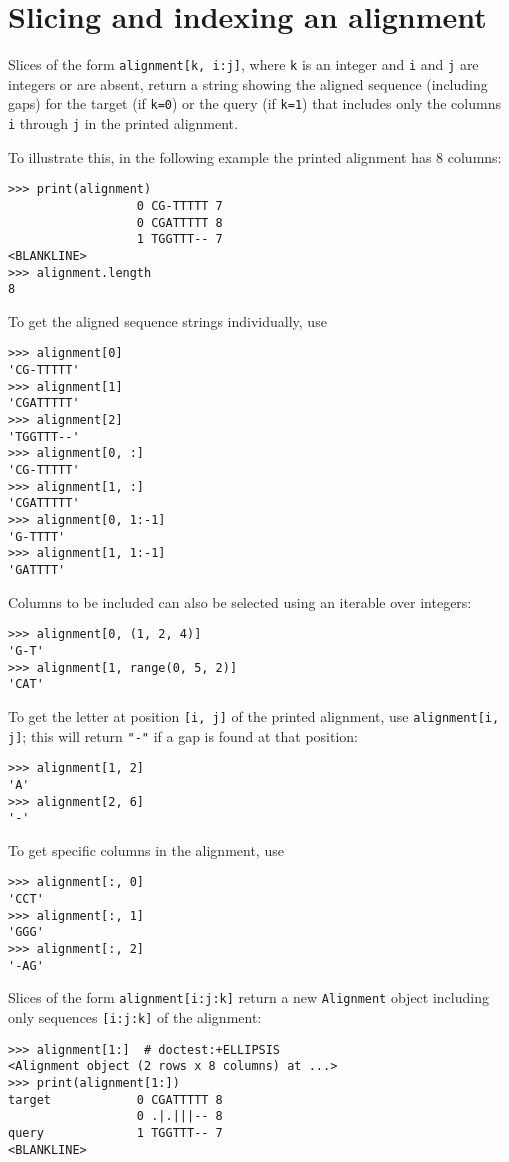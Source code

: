 \section{Slicing and indexing an alignment}

Slices of the form \verb+alignment[k, i:j]+, where \verb+k+ is an integer and \verb+i+ and \verb+j+ are integers or are absent, return a string showing the aligned sequence (including gaps) for the target (if \verb+k=0+) or the query (if \verb+k=1+) that includes only the columns \verb+i+ through \verb+j+ in the printed alignment.

To illustrate this, in the following example the printed alignment has 8 columns:

\begin{verbatim}
>>> print(alignment)
                  0 CG-TTTTT 7
                  0 CGATTTTT 8
                  1 TGGTTT-- 7
<BLANKLINE>
>>> alignment.length
8
\end{verbatim}

To get the aligned sequence strings individually, use
\begin{verbatim}
>>> alignment[0]
'CG-TTTTT'
>>> alignment[1]
'CGATTTTT'
>>> alignment[2]
'TGGTTT--'
>>> alignment[0, :]
'CG-TTTTT'
>>> alignment[1, :]
'CGATTTTT'
>>> alignment[0, 1:-1]
'G-TTTT'
>>> alignment[1, 1:-1]
'GATTTT'
\end{verbatim}

Columns to be included can also be selected using an iterable over integers:
\begin{verbatim}
>>> alignment[0, (1, 2, 4)]
'G-T'
>>> alignment[1, range(0, 5, 2)]
'CAT'
\end{verbatim}

To get the letter at position \verb+[i, j]+ of the printed alignment, use \verb|alignment[i, j]|; this will return \verb|"-"| if a gap is found at that position:
\begin{verbatim}
>>> alignment[1, 2]
'A'
>>> alignment[2, 6]
'-'
\end{verbatim}

To get specific columns in the alignment, use
\begin{verbatim}
>>> alignment[:, 0]
'CCT'
>>> alignment[:, 1]
'GGG'
>>> alignment[:, 2]
'-AG'
\end{verbatim}

Slices of the form \verb+alignment[i:j:k]+ return a new \verb+Alignment+ object including only sequences \verb+[i:j:k]+ of the alignment:
\begin{verbatim}
>>> alignment[1:]  # doctest:+ELLIPSIS
<Alignment object (2 rows x 8 columns) at ...>
>>> print(alignment[1:])
target            0 CGATTTTT 8
                  0 .|.|||-- 8
query             1 TGGTTT-- 7
<BLANKLINE>
\end{verbatim}

